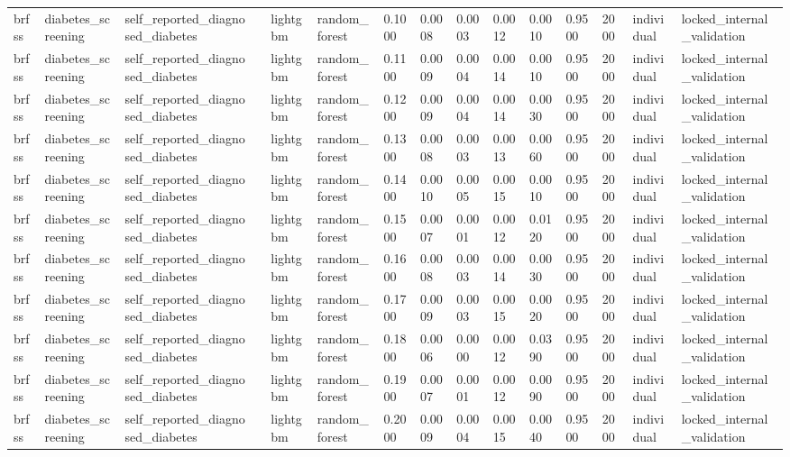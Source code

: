 \begin{tabular}{lllllllllllllll}
brfss & diabetes\_screening & self\_reported\_diagnosed\_diabetes &  & lightgbm & random\_forest & 0.1000 & 0.0008 & 0.0003 & 0.0012 & 0.0010 & 0.9500 & 2000 & individual & locked\_internal\_validation \\
brfss & diabetes\_screening & self\_reported\_diagnosed\_diabetes &  & lightgbm & random\_forest & 0.1100 & 0.0009 & 0.0004 & 0.0014 & 0.0010 & 0.9500 & 2000 & individual & locked\_internal\_validation \\
brfss & diabetes\_screening & self\_reported\_diagnosed\_diabetes &  & lightgbm & random\_forest & 0.1200 & 0.0009 & 0.0004 & 0.0014 & 0.0030 & 0.9500 & 2000 & individual & locked\_internal\_validation \\
brfss & diabetes\_screening & self\_reported\_diagnosed\_diabetes &  & lightgbm & random\_forest & 0.1300 & 0.0008 & 0.0003 & 0.0013 & 0.0060 & 0.9500 & 2000 & individual & locked\_internal\_validation \\
brfss & diabetes\_screening & self\_reported\_diagnosed\_diabetes &  & lightgbm & random\_forest & 0.1400 & 0.0010 & 0.0005 & 0.0015 & 0.0010 & 0.9500 & 2000 & individual & locked\_internal\_validation \\
brfss & diabetes\_screening & self\_reported\_diagnosed\_diabetes &  & lightgbm & random\_forest & 0.1500 & 0.0007 & 0.0001 & 0.0012 & 0.0120 & 0.9500 & 2000 & individual & locked\_internal\_validation \\
brfss & diabetes\_screening & self\_reported\_diagnosed\_diabetes &  & lightgbm & random\_forest & 0.1600 & 0.0008 & 0.0003 & 0.0014 & 0.0030 & 0.9500 & 2000 & individual & locked\_internal\_validation \\
brfss & diabetes\_screening & self\_reported\_diagnosed\_diabetes &  & lightgbm & random\_forest & 0.1700 & 0.0009 & 0.0003 & 0.0015 & 0.0020 & 0.9500 & 2000 & individual & locked\_internal\_validation \\
brfss & diabetes\_screening & self\_reported\_diagnosed\_diabetes &  & lightgbm & random\_forest & 0.1800 & 0.0006 & 0.0000 & 0.0012 & 0.0390 & 0.9500 & 2000 & individual & locked\_internal\_validation \\
brfss & diabetes\_screening & self\_reported\_diagnosed\_diabetes &  & lightgbm & random\_forest & 0.1900 & 0.0007 & 0.0001 & 0.0012 & 0.0090 & 0.9500 & 2000 & individual & locked\_internal\_validation \\
brfss & diabetes\_screening & self\_reported\_diagnosed\_diabetes &  & lightgbm & random\_forest & 0.2000 & 0.0009 & 0.0004 & 0.0015 & 0.0040 & 0.9500 & 2000 & individual & locked\_internal\_validation \\

\end{tabular}
